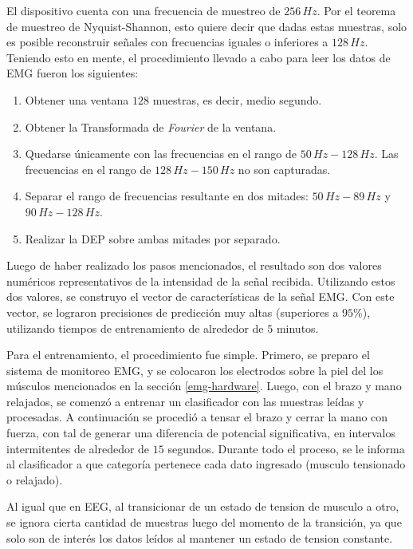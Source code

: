 El dispositivo cuenta con una frecuencia de muestreo de $256\, Hz$. Por el teorema de muestreo de Nyquist-Shannon, esto quiere decir que dadas estas muestras, solo es posible reconstruir señales con frecuencias iguales o inferiores a $128\, Hz$. Teniendo esto en mente, el procedimiento llevado a cabo para leer los datos de EMG fueron los siguientes:

 \begin{enumerate}
 \item Obtener una ventana $128$ muestras, es decir, medio segundo.
 \item Obtener la Transformada de \emph{Fourier} de la ventana.
 \item Quedarse únicamente con las frecuencias en el rango de $50 \, Hz-128 \, Hz$. Las frecuencias en el rango de $128 \, Hz-150 \, Hz$ no son capturadas.
 \item Separar el rango de frecuencias resultante en dos mitades: $50 \, Hz-89 \, Hz$ y $90 \, Hz-128 \, Hz$.
 \item Realizar la DEP sobre ambas mitades por separado.
 \end{enumerate}

Luego de haber realizado los pasos mencionados, el resultado son dos valores numéricos representativos de la intensidad de la señal recibida.  Utilizando estos dos valores, se construyo el vector de características de la señal EMG. Con este vector, se lograron precisiones de predicción muy altas (superiores a $ 95 \%$), utilizando tiempos de entrenamiento de alrededor de $5$ minutos.

Para el entrenamiento, el procedimiento fue simple. Primero, se preparo el sistema de monitoreo EMG, y se colocaron los electrodos sobre la piel del los músculos mencionados en la sección \ref{emg-hardware}. Luego, con el brazo y mano relajados, se comenzó a entrenar un clasificador con las muestras leídas y procesadas. A continuación se procedió a tensar el brazo y cerrar la mano con fuerza, con tal de generar una diferencia de potencial significativa, en intervalos intermitentes de alrededor de $15$ segundos. Durante todo el proceso, se le informa al clasificador a que categoría pertenece cada dato ingresado (musculo tensionado o relajado).

Al igual que en EEG, al transicionar de un estado de tension de musculo a otro, se ignora cierta cantidad de muestras luego del momento de la transición, ya que solo son de interés los datos leídos al mantener un estado de tension constante. 

